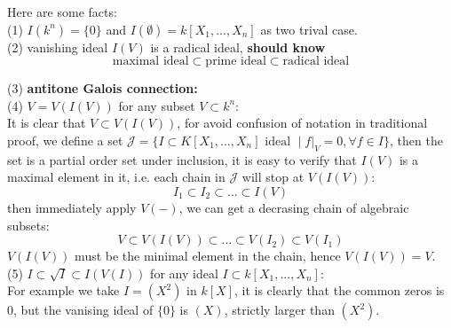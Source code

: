 \begin{remark}
    Here are some facts:\\

    (1) \(I(k^n) = \{0\}\) and \(I(\emptyset) = k[X_1,...,X_n]\) as two trival case.\\

    (2) vanishing ideal \(I(V)\) is a radical ideal, \textbf{should know}
    \[\text{maximal ideal} \subset \text{prime ideal} \subset \text{radical ideal}\]

    (3) \textbf{antitone Galois connection:}\\


    (4) \(V= V(I(V)) \) for any subset \(V \subset k^n\):\\

    It is clear that \(V \subset V(I(V))\), for avoid confusion of notation in traditional proof, we define a set \(\mathcal{J}=\{I \subset K[X_1,\dots,X_n] \text{ ideal } \mid f|_V = 0, \forall f \in I\}\), then the set is a partial order set under inclusion, it is easy to verify that \(I(V)\) is a maximal element in it, i.e. each chain in \(\mathcal{J}\) will stop at \(V(I(V))\):
    \[I_1 \subset I_2 \subset \dots \subset I(V)\]
    then immediately apply \(V(-)\), we can get a decrasing chain of algebraic subsets:
    \[V \subset V(I(V)) \subset \dots \subset V(I_2) \subset V(I_1)\]
    \(V(I(V))\) must be the minimal element in the chain, hence \(V(I(V)) = V\).\\

    (5) \(I \subset \sqrt{I} \subset I(V(I))\) for any ideal \(I \subset k[X_1,...,X_n]\):\\

    For example we take \(I = (X^2)\) in \(k[X]\), it is clearly that the common zeros is 0, but the vanising ideal of \(\{0\}\) is \((X)\), strictly larger than \((X^2)\).

\end{remark}

